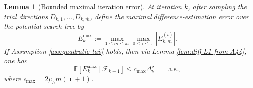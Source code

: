 \documentclass[11pt,a4paper]{article}
\newtheorem{lemma}{Lemma}[section]
\newtheorem{remark}{Remark}[section]
\newcommand{\Imax}{\bar{\imath}}%
\newcommand{\Dexp}{p}
\newcommand{\sara}[1]{{\color{red}{\textbf{[SS: #1]}}\color{black}}}
\begin{document}
\begin{lemma}[Bounded maximal iteration error]
\label{ass:postL1}
At iteration \(k\), after sampling the trial directions
\(D_{k,1},\ldots,D_{k,\bar{m}}\), 
define the maximal difference-estimation error over the potential search tree by
\[
E_k^{\max}
:=
\max_{1\le m\le \bar{m}}
\max_{0\le i\le \Imax}
\left|
E_{k,m}^{(i)}
\right|.
\]
If Assumption \ref{ass:quadratic tail} holds, then via Lemma \ref{lem:diff-L1-from-A44}, one has
\[
\mathbb E\left[
E_k^{\max}
\mid
\mathcal F_{k-1}
\right]
\le
c_{\max}\Delta_k^p
\qquad
\text{a.s.},
\]
where \(c_{\max} = 2\mu_h\bar{m}(\Imax+1)\).
\end{lemma}
\noindent
\end{document}
